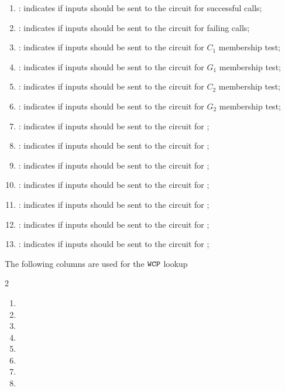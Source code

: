 \begin{enumerate}[resume]
    \item
        \both{\csPointEvaluation}:
        indicates if inputs should be sent to the circuit for successful \instPointEvaluation{} calls;
    \item
        \both{\csPointEvaluationFailure}:
        indicates if inputs should be sent to the circuit for failing \instPointEvaluation{} calls;
    \item
        \both{\csCOne}:
        indicates if inputs should be sent to the circuit for $C_1$ membership test;
    \item
        \both{\csGOne}:
        indicates if inputs should be sent to the circuit for $G_1$ membership test;
    \item
        \both{\csCTwo}:
        indicates if inputs should be sent to the circuit for $C_2$ membership test;
    \item
        \both{\csGTwo}:
        indicates if inputs should be sent to the circuit for $G_2$ membership test;
    \item
        \both{\csPairing}:
        indicates if inputs should be sent to the circuit for \instBlsPairingCheck{};
    \item
        \both{\csGOneAdd}:
        indicates if inputs should be sent to the circuit for \instBlsGOneAdd{};
    \item
        \both{\csGTwoAdd}:
        indicates if inputs should be sent to the circuit for \instBlsGTwoAdd{};
    \item
        \both{\csGOneMsm}:
        indicates if inputs should be sent to the circuit for \instBlsGOneMsm{};
    \item
        \both{\csGTwoMsm}:
        indicates if inputs should be sent to the circuit for \instBlsGTwoMsm{};
    \item
        \both{\csMapFpToGOne}:
        indicates if inputs should be sent to the circuit for \instBlsMapFpToGOne{};
    \item
        \both{\csMapFpTwoToGTwo}:
        indicates if inputs should be sent to the circuit for \instBlsMapFpTwoToGTwo{};
\end{enumerate}
The following columns are used for the $\texttt{WCP}$ lookup
\begin{multicols}{2}
    \begin{enumerate}[resume]
        \item \wcpFlag
        \item \wcpArgOneHi
        \item \wcpArgOneLo
        \item \wcpArgTwoHi
        \item \wcpArgTwoLo
        \item \wcpRes
        \item \wcpInst
        \item[\vspace{\fill}]
    \end{enumerate}
\end{multicols}
